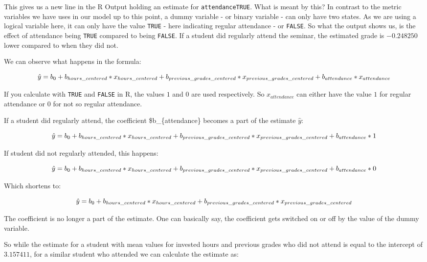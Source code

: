 \documentclass[
]{book}
\begin{document}
This gives us a new line in the R Output holding an estimate for
\texttt{attendanceTRUE}. What is meant by this? In contrast to the metric variables we
have uses in our model up to this point, a dummy variable - or binary variable -
can only have two states. As we are using a logical variable here, it can only
have the value \texttt{TRUE} - here indicating regular attendance - or \texttt{FALSE}. So what
the output shows us, is the effect of attendance being \texttt{TRUE} compared to being
\texttt{FALSE}. If a student did regularly attend the seminar, the estimated grade is
\(-0.248250\) lower compared to when they did not.

We can observe what happens in the formula:

\[\hat{y} = b_0 + b_{hours\_centered}*x_{hours\_centered} + \\
b_{previous\_grades\_centered} * x_{previous\_grades\_centered} +\\ 
b_{attendance} * x_{attendance}\]

If you calculate with \texttt{TRUE} and \texttt{FALSE} in R, the values \(1\) and \(0\) are used
respectively. So \(x_{attendance}\) can either have the value \(1\) for regular
attendance or \(0\) for not so regular attendance.

If a student did regularly attend, the coefficient \$b\_\{attendance\} becomes a
part of the estimate \(\hat{y}\):

\[\hat{y} = b_0 + b_{hours\_centered}*x_{hours\_centered} +\\
b_{previous\_grades\_centered}*x_{previous\_grades\_centered} +\\ 
b_{attendance} * 1\]

If student did not regularly attended, this happens:

\[\hat{y} = b_0 + b_{hours\_centered}*x_{hours\_centered} \\
+ b_{previous\_grades\_centered}*x_{previous\_grades\_centered} +\\
b_{attendance} * 0\]

Which shortens to:

\[\hat{y} = b_0 + b_{hours\_centered}*x_{hours\_centered} +\\
b_{previous\_grades\_centered}*x_{previous\_grades\_centered}\]

The coefficient is no longer a part of the estimate. One can basically say, the
coefficient gets switched on or off by the value of the dummy variable.

So while the estimate for a student with mean values for invested hours and
previous grades who did not attend is equal to the intercept of \(3.157411\),
for a similar student who attended we can calculate the estimate as:
\end{document}
